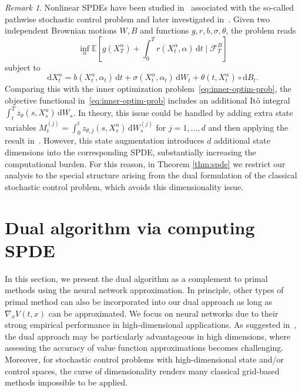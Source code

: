 \documentclass[11pt]{article}
\numberwithin{equation}{section}
\theoremstyle{plain}
\theoremstyle{definition}
\theoremstyle{remark}
\newtheorem{remark}[theorem]{Remark}
\newcommand{\bE}{\mathbb{E}}
\newcommand{\dd}{\mathrm{d}}
\begin{document}
\begin{remark}
Nonlinear SPDEs have been studied in~\cite{lions1998fully} associated with the so-called pathwise stochastic control problem and later investigated in~\cite{buckdahn2007pathwise}. Given two independent Brownian motions $W, B$ and functions $g, r, b, \sigma, \theta$, the problem reads 
\begin{equation*}
    \inf_{\alpha} \bE\left[ g(X_T^\alpha) + \int_0^T r(X_t^\alpha, \alpha)\,\dd t \mid \mathcal{F}_T^B \right]
\end{equation*}
subject to 
\begin{equation*}
    \dd X_t^\alpha = b(X_t^\alpha, \alpha_t)\,\dd t + \sigma(X_t^\alpha, \alpha_t)\,\dd W_t + \theta(t, X_t^\alpha)\circ \dd B_t.  
\end{equation*}
Comparing this with the inner optimization problem~\eqref{eq:inner-optim-prob}, the objective functional in~\eqref{eq:inner-optim-prob} includes an additional It\^{o} integral $\int_t^T z_\theta(s, X_s^u)\,\dd W_s$. In theory, this issue could be handled by adding extra state variables $M_t^{(j)} = \int_0^t z_{\theta,j}(s, X_s^u)\,\dd W_s^{(j)}$ for $j=1,\dots, d$ and then applying the result in~\cite{buckdahn2007pathwise}. However, this state augmentation introduces $d$ additional state dimensions into the corresponding SPDE, substantially increasing the computational burden. For this reason, in Theorem \ref{thm:spde} we restrict our analysis to the special structure arising from the dual formulation of the classical stochastic control problem, which avoids this dimensionality issue.
\end{remark}

\section{Dual algorithm via computing SPDE} \label{sec:dual-algorithm}
In this section, we present the dual algorithm as a complement to primal methods using the neural network approximation. In principle, other types of primal method can also be incorporated into our dual approach as long as $\nabla_x V(t,x)$ can be approximated. We focus on neural networks due to their strong empirical performance in high-dimensional applications. As suggested in~\cite{rogers2007pathwise}, the dual approach may be particularly advantageous in high dimensions, where assessing the accuracy of value function approximations becomes challenging. Moreover, for stochastic control problems with high-dimensional state and/or control spaces, the curse of dimensionality renders many classical grid-based methods impossible to be applied. 
\end{document}
